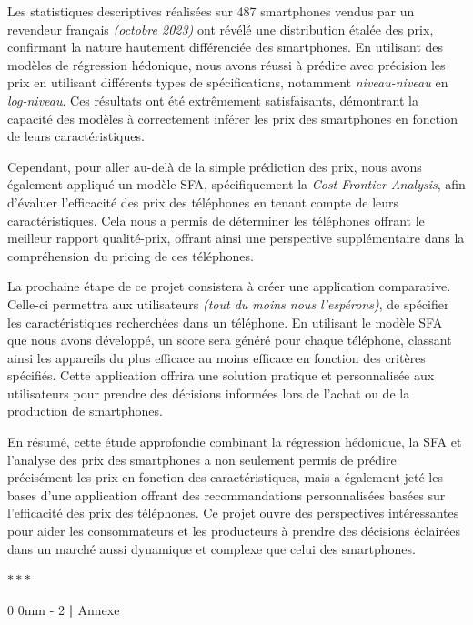 \documentclass[
  12pt,
]{report}
\makeatletter
\newcommand{\macrostars}{
    \vspace{2em}
    \begin{center}
        \textcolor{highlight!80!black}{\Large{$\ast\ast\ast$}}
    \end{center}
}
\renewcommand{\chapter}{%
    \clearpage %
    \@startsection{chapter}%
    {0} %
    {0mm} %
    {-\baselineskip} %
    {2\baselineskip} %
    {\normalfont\Huge\bfseries | \Huge\bfseries}%
}
\makeatother
\begin{document}
Les statistiques descriptives réalisées sur 487 smartphones vendus par
un revendeur français \emph{(octobre 2023)} ont révélé une distribution
étalée des prix, confirmant la nature hautement différenciée des
smartphones. En utilisant des modèles de régression hédonique, nous
avons réussi à prédire avec précision les prix en utilisant différents
types de spécifications, notamment \emph{niveau-niveau} en
\emph{log-niveau}. Ces résultats ont été extrêmement satisfaisants,
démontrant la capacité des modèles à correctement inférer les prix des
smartphones en fonction de leurs caractéristiques.

Cependant, pour aller au-delà de la simple prédiction des prix, nous
avons également appliqué un modèle SFA, spécifiquement la \emph{Cost
Frontier Analysis}, afin d'évaluer l'efficacité des prix des téléphones
en tenant compte de leurs caractéristiques. Cela nous a permis de
déterminer les téléphones offrant le meilleur rapport qualité-prix,
offrant ainsi une perspective supplémentaire dans la compréhension du
pricing de ces téléphones.

La prochaine étape de ce projet consistera à créer une application
comparative. Celle-ci permettra aux utilisateurs \emph{(tout du moins
nous l'espérons)}, de spécifier les caractéristiques recherchées dans un
téléphone. En utilisant le modèle SFA que nous avons développé, un score
sera généré pour chaque téléphone, classant ainsi les appareils du plus
efficace au moins efficace en fonction des critères spécifiés. Cette
application offrira une solution pratique et personnalisée aux
utilisateurs pour prendre des décisions informées lors de l'achat ou de
la production de smartphones.

En résumé, cette étude approfondie combinant la régression hédonique, la
SFA et l'analyse des prix des smartphones a non seulement permis de
prédire précisément les prix en fonction des caractéristiques, mais a
également jeté les bases d'une application offrant des recommandations
personnalisées basées sur l'efficacité des prix des téléphones. Ce
projet ouvre des perspectives intéressantes pour aider les consommateurs
et les producteurs à prendre des décisions éclairées dans un marché
aussi dynamique et complexe que celui des smartphones.

\macrostars

\chapter{Annexe}\label{annexe}
\end{document}
